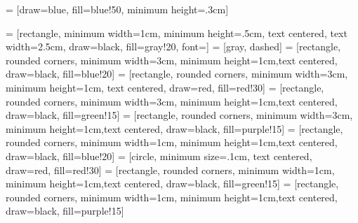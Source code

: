 \theoremstyle{definition}
\newtheorem{thm}{Theorem}[chapter]
\newtheorem{defn}[thm]{Definition}
\newtheorem{lem}[thm]{Lemma}
\newtheorem{cor}[thm]{Corollary}
\newtheorem{conj}[thm]{Conjecture}
\newtheorem{prop}[thm]{Proposition}
\newtheorem{alg}[thm]{Algorithm}




\usetikzlibrary{cd}
\usetikzlibrary{matrix}
\usetikzlibrary{shapes.geometric}
\usetikzlibrary{arrows}
\usetikzlibrary{quantikz2}

 = [draw=blue, fill=blue!50, minimum height=.3cm]

 = [rectangle, minimum width=1cm, minimum height=.5cm, text
centered, text width=2.5cm, draw=black, fill=gray!20, font=\footnotesize]
 = [gray, dashed]
 = [rectangle, rounded corners, minimum width=3cm, minimum
height=1cm,text centered, draw=black, fill=blue!20]
 = [rectangle, rounded corners, minimum width=3cm, minimum height=1cm, text
centered, draw=red, fill=red!30]
 = [rectangle, rounded corners, minimum width=3cm, minimum
height=1cm,text centered, draw=black, fill=green!15]
 = [rectangle, rounded corners, minimum width=3cm, minimum
height=1cm,text centered, draw=black, fill=purple!15]
 = [rectangle, rounded corners, minimum width=1cm, minimum
height=1cm,text centered, draw=black, fill=blue!20]
 = [circle, minimum size=.1cm, text centered, draw=red, fill=red!30]
 = [rectangle, rounded corners, minimum width=1cm, minimum
height=1cm,text centered, draw=black, fill=green!15]
 = [rectangle, rounded corners, minimum width=1cm, minimum
height=1cm,text centered, draw=black, fill=purple!15]

